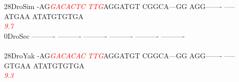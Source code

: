 \documentclass[11pt,twoside,reqno,a4paper]{article}
\begin{document}
{28\hspace*{2\charwidth}DroSim	-AG\textit{\textcolor{red}{G}}\textit{\textcolor{red}{A}}\textit{\textcolor{red}{C}}\textit{\textcolor{red}{A}}\textit{\textcolor{red}{C}}\textit{\textcolor{red}{T}}\textit{\textcolor{red}{C}}	\textit{\textcolor{red}{T}}\textit{\textcolor{red}{T}}\textit{\textcolor{red}{G}}AGGATGT	CGGCA---GG	AGG-------	-----ATGAA	ATATGTGTGA	\\
\hspace*{4\charwidth}\hspace*{7\charwidth}\hspace*{3\charwidth}\textit{\textcolor{red}{9.7}}\hspace*{1\charwidth}\hspace*{1\charwidth}\hspace*{1\charwidth}\hspace*{1\charwidth}\hspace*{1\charwidth}\hspace*{1\charwidth}\\
0\hspace*{3\charwidth}DroSec	----------	----------	----------	----------	----------	----------	\\
\hspace*{4\charwidth}\hspace*{7\charwidth}\hspace*{1\charwidth}\hspace*{1\charwidth}\hspace*{1\charwidth}\hspace*{1\charwidth}\hspace*{1\charwidth}\hspace*{1\charwidth}\\
28\hspace*{2\charwidth}DroYak	-AG\textit{\textcolor{red}{G}}\textit{\textcolor{red}{A}}\textit{\textcolor{red}{C}}\textit{\textcolor{red}{A}}\textit{\textcolor{red}{C}}\textit{\textcolor{red}{A}}\textit{\textcolor{red}{C}}	\textit{\textcolor{red}{T}}\textit{\textcolor{red}{T}}\textit{\textcolor{red}{G}}AGGATGT	CGGCA---GG	AGG-------	-----GTGAA	ATATGTGTGA	\\
\hspace*{4\charwidth}\hspace*{7\charwidth}\hspace*{3\charwidth}\textit{\textcolor{red}{9.3}}\hspace*{1\charwidth}\hspace*{1\charwidth}\hspace*{1\charwidth}\hspace*{1\charwidth}\hspace*{1\charwidth}\hspace*{1\charwidth}\\
}
\end{document}
